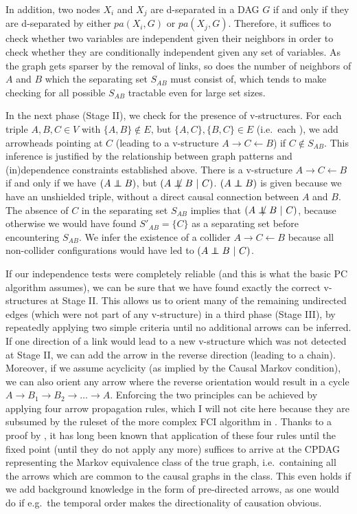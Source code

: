 In addition, two nodes $X_i$ and $X_j$ are d-separated in a DAG $G$ if and only if they are d-separated by either $pa(X_i,G)$ or $pa(X_j,G)$. Therefore, it suffices to check whether two variables are independent given their neighbors in order to check whether they are conditionally independent given any set of variables. As the graph gets sparser by the removal of links, so does the number of neighbors of $A$ and $B$ which the separating set $S_{AB}$ must consist of, which tends to make checking for all possible $S_{AB}$ tractable even for large set sizes.

In the next phase (Stage II), we check for the presence of v-structures. For each triple $A,B,C \in V$ with $\{A,B\} \notin E$, but $\{A,C\},\{B,C\} \in E$ (i.e.\ each \textit{}), we add arrowheads pointing at $C$ (leading to a v-structure $A \rightarrow C \leftarrow B$) if $C \notin S_{AB}$. This inference is justified by the relationship between graph patterns and (in)dependence constraints established above. There is a v-structure $A \rightarrow C \leftarrow B$ if and only if we have $(A \independent B)$, but $(A \notindep B\ |\ C)$.  $(A \independent B)$ is given because we have an unshielded triple, without a direct causal connection between $A$ and $B$. The absence of $C$ in the separating set $S_{AB}$ implies that $(A \notindep B\ |\ C)$, because otherwise we would have found $S'_{AB} = \{C\}$ as a separating set before encountering $S_{AB}$. We infer the existence of a collider $A \rightarrow C \leftarrow B$ because all non-collider configurations would have led to $(A \independent B\ |\ C)$.

If our independence tests were completely reliable (and this is what the basic PC algorithm assumes), we can be sure that we have found exactly the correct v-structures at Stage II. This allows us to orient many of the remaining undirected edges (which were not part of any v-structure) in a third phase (Stage III), by repeatedly applying two simple criteria until no additional arrows can be inferred. If one direction of a link would lead to a new v-structure which was not detected at Stage II, we can add the arrow in the reverse direction (leading to a chain). Moreover, if we assume acyclicity (as implied by the Causal Markov condition), we can also orient any arrow where the reverse orientation would result in a cycle $A \rightarrow B_1 \rightarrow B_2 \rightarrow \dots \rightarrow A$. Enforcing the two principles can be achieved by applying four arrow propagation rules, which I will not cite here because they are subsumed by the ruleset of the more complex FCI algorithm in . Thanks to a proof by \cite{meek1995}, it has long been known that application of these four rules until the fixed point (until they do not apply any more) suffices to arrive at the CPDAG representing the Markov equivalence class of the true graph, i.e.\ containing all the arrows which are common to the causal graphs in the class. This even holds if we add background knowledge in the form of pre-directed arrows, as one would do if e.g.\ the temporal order makes the directionality of causation obvious.

